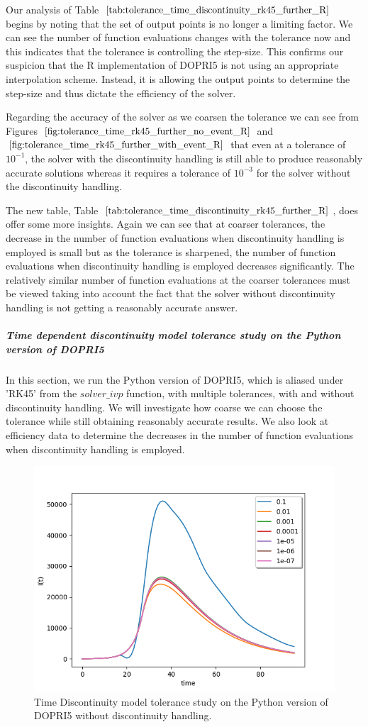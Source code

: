Our analysis of Table $\ref{tab:tolerance_time_discontinuity_rk45_further_R}$ begins by noting that the set of output points is no longer a limiting factor. We can see the number of function evaluations changes with the tolerance now and this indicates that the tolerance is controlling the step-size. This confirms our suspicion that the R implementation of DOPRI5 is not using an appropriate interpolation scheme. Instead, it is allowing the output points to determine the step-size and thus dictate the efficiency of the solver.

Regarding the accuracy of the solver as we coarsen the tolerance we can see from Figures $\ref{fig:tolerance_time_rk45_further_no_event_R}$ and $\ref{fig:tolerance_time_rk45_further_with_event_R}$ that even at a tolerance of $10^{-1}$, the solver with the discontinuity handling is still able to produce reasonably accurate solutions whereas it requires a tolerance of $10^{-3}$ for the solver without the discontinuity handling.

The new table, Table $\ref{tab:tolerance_time_discontinuity_rk45_further_R}$, does offer some more insights. Again we can see that at coarser tolerances, the decrease in the number of function evaluations when discontinuity handling is employed is small but as the tolerance is sharpened, the number of function evaluations when discontinuity handling is employed decreases significantly. The relatively similar number of function evaluations at the coarser tolerances must be viewed taking into account the fact that the solver without discontinuity handling is not getting a reasonably accurate answer. 

\subparagraph{Time dependent discontinuity model tolerance study on the Python version of DOPRI5}
In this section, we run the Python version of DOPRI5, which is aliased under 'RK45' from the $solver\_ivp$ function, with multiple tolerances, with and without discontinuity handling. We will investigate how coarse we can choose the tolerance while still obtaining reasonably accurate results. We also look at efficiency data to determine the decreases in the number of function evaluations when discontinuity handling is employed.

\begin{figure}[H]
\centering
\includegraphics[width=0.7\linewidth]{./figures/tolerance_time_rk45_no_event_py}
\caption{Time Discontinuity model tolerance study on the Python version of DOPRI5 without discontinuity handling.}
\label{fig:tolerance_time_rk45_no_event_py}
\end{figure}


